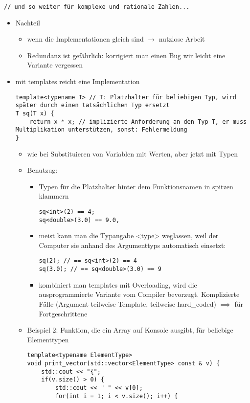 \documentclass[a4paper]{scrartcl}
\theoremstyle{definition}
\theoremstyle{plain}
\theoremstyle{remark}
\theoremstyle{remark}
\begin{document}
\begin{itemize}
\begin{enumerate}
\begin{verbatim}
// und so weiter für komplexe und rationale Zahlen...
\end{verbatim}
\begin{itemize}
\item Nachteil
\begin{itemize}
\item wenn die Implementationen gleich sind $\rightarrow$ nutzlose Arbeit
\item Redundanz ist gefährlich: korrigiert man einen Bug wir leicht eine Variante vergessen
\end{itemize}
\item mit templates reicht eine Implementation
\begin{verbatim}
template<typename T> // T: Platzhalter für beliebigen Typ, wird später durch einen tatsächlichen Typ ersetzt
T sq(T x) {
	return x * x; // implizierte Anforderung an den Typ T, er muss Multiplikation unterstützen, sonst: Fehlermeldung
}
\end{verbatim}
\begin{itemize}
\item wie bei Substituieren von Variablen mit Werten, aber jetzt mit Typen
\item Benutzug:
\begin{itemize}
\item Typen für die Platzhalter hinter dem Funktionsnamen in spitzen klammern
\begin{verbatim}
sq<int>(2) == 4;
sq<double>(3.0) == 9.0,
\end{verbatim}
\item meist kann man die Typangabe <type> weglassen, weil der Computer sie anhand des Argumenttyps automatisch einsetzt:
\begin{verbatim}
sq(2); // == sq<int>(2) == 4
sq(3.0); // == sq<double>(3.0) == 9
\end{verbatim}
\item kombiniert man templates mit Overloading, wird die ausprogrammierte Variante vom Compiler bevorzugt.
Komplizierte Fälle (Argument teilweise Template, teilweise hard\_coded) $\implies$ für Fortgeschrittene
\end{itemize}
\item Beispiel 2: Funktion, die ein Array auf Konsole ausgibt, für beliebige Elementtypen
\begin{verbatim}
template<typename ElementType>
void print_vector(std::vector<ElementType> const & v) {
	std::cout << "{";
	if(v.size() > 0) {
		std::cout << " " << v[0];
		for(int i = 1; i < v.size(); i++) {

\end{verbatim}
\end{itemize}
\end{itemize}
\end{enumerate}
\end{itemize}
\end{document}
